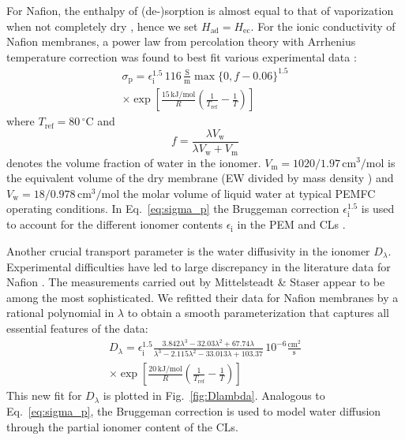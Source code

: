 \documentclass[fontsize=9pt,DIV=calc,a4paper,twocolumn]{scrartcl}
\begin{document}
For Nafion, the enthalpy of (de-)sorption is almost equal to that of vaporization when not completely dry \cite{wadso:13}, hence we set $H_\mathrm{ad}=H_\mathrm{ec}$. For the ionic conductivity of Nafion membranes, a power law from percolation theory with Arrhenius temperature correction was found to best fit various experimental data \cite{weber:04}:
%
\begin{multline}
\label{eq:sigma_p}
\sigma_\mathrm{p} = \epsilon_\mathrm{i}^{1.5}\,116\,\frac{\mathrm{S}}{\mathrm{m}}\max\{0,f-0.06\}^{1.5}\\
\times\exp\left[\frac{15\,\mathrm{kJ/mol}}{R}\left(\frac{1}{T_\mathrm{ref}}-\frac{1}{T}\right)\right]
\end{multline}
%
where $T_\mathrm{ref}=80\,^\circ\mathrm{C}$ and
%
\begin{equation}
f = \frac{\lambda V_\mathrm{w}}{\lambda V_\mathrm{w}+V_\mathrm{m}}
\end{equation}
%
denotes the volume fraction of water in the ionomer. $V_\mathrm{m}=1020/1.97\,\mathrm{cm}^3/\mathrm{mol}$ is the equivalent volume of the dry membrane (EW \cite{peron:10} divided by mass density \cite{nafion:16}) and $V_\mathrm{w}=18/0.978\,\mathrm{cm}^3/\mathrm{mol}$ the molar volume of liquid water at typical PEMFC operating conditions. In Eq.~\ref{eq:sigma_p} the Bruggeman correction $\epsilon_\mathrm{i}^{1.5}$ is used to account for the different ionomer contents $\epsilon_\mathrm{i}$ in the PEM and CLs \cite{dujc:18}.

Another crucial transport parameter is the water diffusivity in the ionomer $D_\lambda$. Experimental difficulties have led to large discrepancy in the literature data for Nafion \cite{kusoglu:17}. The measurements carried out by Mittelsteadt \& Staser \cite{mittelsteadt:11} appear to be among the most sophisticated. We refitted their data for Nafion membranes by a rational polynomial in $\lambda$ to obtain a smooth parameterization that captures all essential features of the data:
%
\begin{multline}
\label{eq:Dlambda}
D_\lambda = \epsilon_\mathrm{i}^{1.5} \frac{3.842\lambda^3-32.03\lambda^2+67.74\lambda}{\lambda^3-2.115\lambda^2-33.013\lambda+103.37}\,10^{-6}\frac{\mathrm{cm}^2}{\mathrm{s}}\\
\times\exp\left[\frac{20\,\mathrm{kJ/mol}}{R}\left(\frac{1}{T_\mathrm{ref}}-\frac{1}{T}\right)\right]
\end{multline}
%
This new fit for $D_\lambda$ is plotted in Fig.~\ref{fig:Dlambda}. Analogous to Eq.~\ref{eq:sigma_p}, the Bruggeman correction is used to model water diffusion through the partial ionomer content of the CLs.
\end{document}
